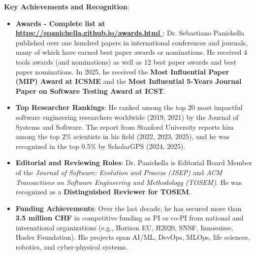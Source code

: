 \documentclass[11pt]{article}
\begin{document}
\vspace{1mm}
 \textbf{Key Achievements and Recognition}:
\begin{itemize}
\vspace{-2mm} 
 \item \textbf{Awards - Complete list at \href{https://spanichella.github.io/awards.html}{https://spanichella.github.io/awards.html
}}: Dr. Sebastiano Panichella published over one hundred papers in international conferences and journals, many of which have earned best paper awards or nominations. He received 4 tools awards (and nominations) as well as 12 best paper awards and best paper nominations. In 2025, he received the \textbf{Most Influential Paper (MIP) Award at ICSME} and the \textbf{Most Influential 5-Years Journal Paper on Software Testing Award at ICST}. 
  \vspace{-2.5mm}
\item 
    \textbf{Top Researcher Rankings}: He ranked among the top 20 most impactful software engineering researchers worldwide (2019, 2021) by the Journal of Systems and Software. The report from Stanford University reports him among the top 2\% scientists in his field (2022, 2023, 2025), and he was recognized in the top 0.5\% by ScholarGPS (2024, 2025). 
\item
    \textbf{Editorial and Reviewing Roles}: Dr. Panichella is Editorial Board Member of the \textit{Journal of Software: Evolution and Process (JSEP)} and \textit{ACM Transactions on Software Engineering and Methodology (TOSEM)}. He was recognized as a \textbf{Distinguished Reviewer for TOSEM}. 
 \vspace{-2.5mm}
 \item 
    \textbf{Funding Achievements}: Over the last decade, he has secured more than \textbf{3.5 million CHF} in competitive funding as PI or co-PI from national and international organizations (e.g., Horizon EU, H2020, SNSF, Innosuisse, Hasler Foundation). His projects span AI/ML, DevOps, MLOps, life sciences, robotics, and cyber-physical systems. 
 \vspace{-2.5mm}

\end{itemize}
\end{document}
